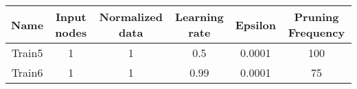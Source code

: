 \documentclass[11pt,fleqn]{book} %
\begin{document}
																																																																																																																																																																																																																																																																						    \begin{table}[h!]
																																																																																																																																																																																																																																																																						      \centering
																																																																																																																																																																																																																																																																						          \begin{tabular}{ c c c c c c }
																																																																																																																																																																																																																																																																							      \hline\hline
																																																																																																																																																																																																																																																																							          
																																																																																																																																																																																																																																																																								      Name & Input nodes & Normalized data & Learning rate & Epsilon & Pruning Frequency\\
																																																																																																																																																																																																																																																																								          \hline
																																																																																																																																																																																																																																																																									      
																																																																																																																																																																																																																																																																									          Train5 & 1 & 1 & 0.5 & 0.0001 & 100\\
																																																																																																																																																																																																																																																																										      Train6 & 1 & 1 & 0.99 & 0.0001 & 75\\


\end{tabular}
\end{table}
\end{document}
